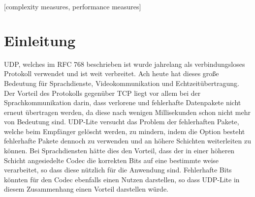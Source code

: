 \documentclass{template}
\begin{document}
\maketitle
\begin{abstract}
In diesem Dokument wird das Leightweight User Datagram Protokoll (UDP-Lite) beschrieben, welches ähnlich UDP ist. Der Focus dieses Dokuments liegt in der Beschreibung der Vorteile, die UDP-Lite gegenüber UDP aufweisen kann. Des Weiteren wird das Protokoll in das ISO OSI-Referenzmodell eingeordnet und die Auswirkungen auf andere Schichten in diesem beschrieben.
Dieses Dokument orientiert sich stark am RFC.

------------------------------
 \LaTeX\ {\em alternate} \textit{bla}
\end{abstract}

[complexity measures, performance measures]



\section{Einleitung}

UDP, welches im RFC 768 beschrieben ist wurde jahrelang als verbindungsloses Protokoll verwendet und ist weit verbreitet. Ach heute hat dieses große Bedeutung für Sprachdienste, Videokommunikation und Echtzeitübertragung. Der Vorteil des Protokolls gegenüber TCP liegt vor allem bei der Sprachkommunikation darin, dass verlorene und fehlerhafte Datenpakete nicht erneut übertragen werden, da diese nach wenigen Millisekunden schon nicht mehr von Bedeutung sind. UDP-Lite versucht das Problem der fehlerhaften Pakete, welche beim Empfänger gelöscht werden, zu mindern, indem die Option besteht fehlerhafte Pakete dennoch zu verwenden und an höhere Schichten weiterleiten zu können. Bei Sprachdiensten hätte dies den Vorteil, dass der in einer höheren Schicht angesiedelte Codec die korrekten Bits auf eine bestimmte weise verarbeitet, so dass diese nützlich für die Anwendung sind. Fehlerhafte Bits könnten für den Codec ebenfalls einen Nutzen darstellen, so dass UDP-Lite in diesem Zusammenhang einen Vorteil darstellen würde.
\end{document}
